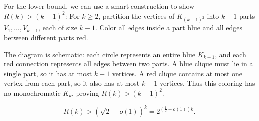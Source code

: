 For the lower bound, we can use a smart construction to show \(R(k) > (k - 1)^2\):
For \(k\ge 2\), partition the vertices of \(K_{(k-1)^2}\) into \(k-1\) parts \(V_1,\ldots,V_{k-1}\), each of size \(k-1\). Color all edges inside a part blue and all edges between different parts red.
\begin{center}
\end{center}
The diagram is schematic: each circle represents an entire blue \(K_{k-1}\), and each red connection represents all edges between two parts. A blue clique must lie in a single part, so it has at most \(k-1\) vertices. A red clique contains at most one vertex from each part, so it also has at most \(k-1\) vertices. Thus this coloring has no monochromatic \(K_k\), proving \(R(k)>(k-1)^2\).

\begin{theorem}[Erd\H{o}s, 1947]\label{thm:erdos-ramsey}
    \[
        R(k) > (\sqrt{2} - o(1))^k = 2^{\left( \frac{1}{2} - o(1) \right) k}.
    \] 
\end{theorem}

